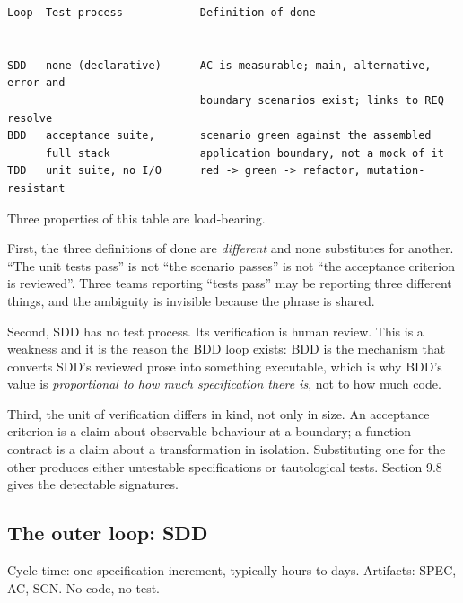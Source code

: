\documentclass[11pt,a4paper]{article}
\begin{document}
\begin{Verbatim}[fontsize=\footnotesize,breaklines=true,breakanywhere=true,breakautoindent=false,samepage=false]
Loop  Test process            Definition of done
----  ----------------------  -------------------------------------------
SDD   none (declarative)      AC is measurable; main, alternative, error and
                              boundary scenarios exist; links to REQ resolve
BDD   acceptance suite,       scenario green against the assembled
      full stack              application boundary, not a mock of it
TDD   unit suite, no I/O      red -> green -> refactor, mutation-resistant
\end{Verbatim}

Three properties of this table are load-bearing.

First, the three definitions of done are \emph{different} and none substitutes for another. ``The unit tests pass'' is not ``the scenario passes'' is not ``the acceptance criterion is reviewed''. Three teams reporting ``tests pass'' may be reporting three different things, and the ambiguity is invisible because the phrase is shared.

Second, SDD has no test process. Its verification is human review. This is a weakness and it is the reason the BDD loop exists: BDD is the mechanism that converts SDD's reviewed prose into something executable, which is why BDD's value is \emph{proportional to how much specification there is}, not to how much code.

Third, the unit of verification differs in kind, not only in size. An acceptance criterion is a claim about observable behaviour at a boundary; a function contract is a claim about a transformation in isolation. Substituting one for the other produces either untestable specifications or tautological tests. Section 9.8 gives the detectable signatures.

\subsection{The outer loop: SDD}

Cycle time: one specification increment, typically hours to days. Artifacts: SPEC, AC, SCN. No code, no test.
\end{document}
